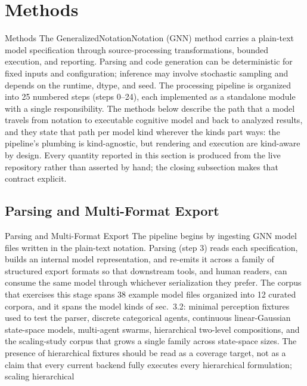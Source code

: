 \documentclass[
  ignorenonframetext,
]{beamer}
\author{\texorpdfstring{}{}}
\date{}
\begin{document}
\section{Methods}\label{sec:methods}

\begin{frame}[allowframebreaks]{Methods}
The GeneralizedNotationNotation (GNN) method carries a plain-text model
specification through source-processing transformations, bounded
execution, and reporting. Parsing and code generation can be
deterministic for fixed inputs and configuration; inference may involve
stochastic sampling and depends on the runtime, dtype, and seed. The
processing pipeline is organized into 25 numbered steps (steps 0--24),
each implemented as a standalone module with a single responsibility.
The methods below describe the path that a model travels from notation
to executable cognitive model and back to analyzed results, and they
state that path per model kind wherever the kinds part ways: the
pipeline's plumbing is kind-agnostic, but rendering and execution are
kind-aware by design. Every quantity reported in this section is
produced from the live repository rather than asserted by hand; the
closing subsection makes that contract explicit.
\end{frame}

\subsection{Parsing and Multi-Format
Export}\label{parsing-and-multi-format-export}

\begin{frame}[allowframebreaks]{Parsing and Multi-Format Export}
The pipeline begins by ingesting GNN model files written in the
plain-text notation. Parsing (step 3) reads each specification, builds
an internal model representation, and re-emits it across a family of
structured export formats so that downstream tools, and human readers,
can consume the same model through whichever serialization they prefer.
The corpus that exercises this stage spans 38 example model files
organized into 12 curated corpora, and it spans the model kinds of
sec.~3.2: minimal perception fixtures used to test the
parser, discrete categorical agents, continuous linear-Gaussian
state-space models, multi-agent swarms, hierarchical two-level
compositions, and the scaling-study corpus that grows a single family
across state-space sizes. The presence of hierarchical fixtures should
be read as a coverage target, not as a claim that every current backend
fully executes every hierarchical formulation; scaling hierarchical
\end{frame}
\end{document}
